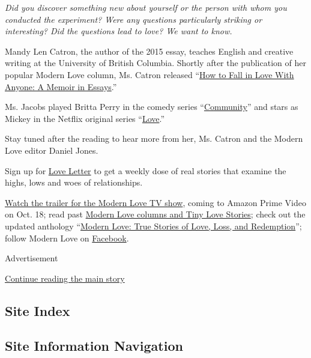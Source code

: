 \emph{Did you discover something new about yourself or the person with
whom you conducted the experiment? Were any questions particularly
striking or interesting? Did the questions lead to love? We want to
know.}

Mandy Len Catron, the author of the 2015 essay, teaches English and
creative writing at the University of British Columbia. Shortly after
the publication of her popular Modern Love column, Ms. Catron released
``\href{https://www.simonandschuster.com/books/How-to-Fall-in-Love-with-Anyone/Mandy-Len-Catron/9781501137457}{How
to Fall in Love With Anyone: A Memoir in Essays}.''

Ms. Jacobs played Britta Perry in the comedy series
``\href{https://www.nbc.com/community}{Community}'' and stars as Mickey
in the Netflix original series
``\href{https://www.netflix.com/title/80026506}{Love}.''

Stay tuned after the reading to hear more from her, Ms. Catron and the
Modern Love editor Daniel Jones.

Sign up for
\href{https://www.nytimes3xbfgragh.onion/newsletters/love-letter}{Love
Letter} to get a weekly dose of real stories that examine the highs,
lows and woes of relationships.

\href{https://www.nytimes3xbfgragh.onion/2019/09/12/style/modern-love-tv-show-trailer.html}{Watch
the trailer for the Modern Love TV show}, coming to Amazon Prime Video
on Oct. 18; read past
\href{https://www.nytimes3xbfgragh.onion/column/modern-love}{Modern Love
columns and Tiny Love Stories}; check out the updated anthology
``\href{https://www.penguinrandomhouse.com/books/623036/modern-love-revised-and-updated-by-edited-by-daniel-jones-with-contributions-by-andrew-rannells-ayelet-waldman-amy-krouse-rosenthal-veronica-chambers-and-more/}{Modern
Love: True Stories of Love, Loss, and Redemption}''; follow Modern Love
on \href{https://www.facebookcorewwwi.onion/modernlove}{Facebook}.

Advertisement

\protect\hyperlink{after-bottom}{Continue reading the main story}

\hypertarget{site-index}{%
\subsection{Site Index}\label{site-index}}

\hypertarget{site-information-navigation}{%
\subsection{Site Information
Navigation}\label{site-information-navigation}}

